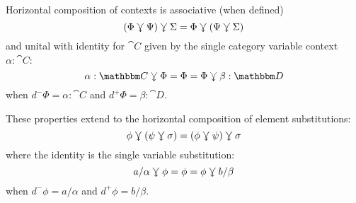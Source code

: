 \documentclass{llncs}
\begin{document}
\begin{lemma}
  Horizontal composition of contexts is associative (when defined)
  \[ (\Phi \curlyveedownarrow \Psi) \curlyveedownarrow \Sigma = \Phi \curlyveedownarrow (\Psi \curlyveedownarrow \Sigma) \]
  and unital with identity for $\cat C$ given by the single category
  variable context $\alpha:\cat C$:
  \[ \alpha:\cat C \jnctx \Phi = \Phi = \Phi \jnctx \beta:\cat D\]
  when $d^-\Phi = \alpha:\cat C$ and $d^+\Phi = \beta:\cat D$.

  These properties extend to the horizontal composition of element substitutions:
  \[ \phi \curlyveedownarrow (\psi \curlyveedownarrow \sigma) = (\phi \curlyveedownarrow \psi) \curlyveedownarrow \sigma \]
  where the identity is the single variable substitution:
  \[ a/\alpha \curlyveedownarrow \phi = \phi = \phi \curlyveedownarrow b/\beta \]
  when $d^-\phi = a/\alpha$ and $d^+\phi = b/\beta$.
\end{lemma}
\end{document}
